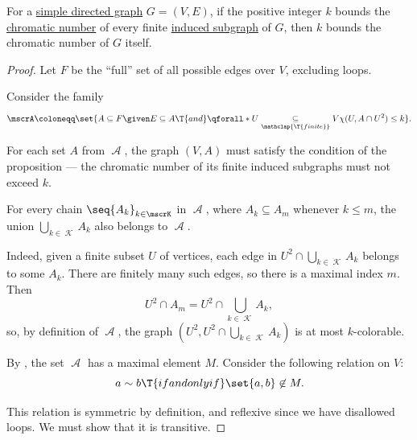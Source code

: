 \begin{theorem}\label{thm:erdos_de_bruijn_theorem}
  For a \hyperref[def:undirected_graph]{simple directed graph} \( G = (V, E) \), if the positive integer \( k \) bounds the \hyperref[def:graph_chromatic_number]{chromatic number} of every finite \hyperref[def:induced_subgraph]{induced subgraph} of \( G \), then \( k \) bounds the chromatic number of \( G \) itself.
\end{theorem}
\begin{proof}
   Let \( F \) be the \enquote{full} set of all possible edges over \( V \), excluding loops.

  Consider the family
  \begin{equation*}
    \mscrA \coloneqq \set{ A \subseteq F \given E \subseteq A \T{and} \qforall*{U \underset {\mathclap{\T{finite}}} \subseteq V} \chi(U, A \cap U^2) \leq k }.
  \end{equation*}

  For each set \( A \) from \( \mscrA \), the graph \( (V, A) \) must satisfy the condition of the proposition --- the chromatic number of its finite induced subgraphs must not exceed \( k \).

  For every chain \( \seq{ A_k }_{k \in \mscrK} \) in \( \mscrA \), where \( A_k \subseteq A_m \) whenever \( k \leq m \), the union \( \bigcup_{k \in \mscrK} A_k \) also belongs to \( \mscrA \).

  Indeed, given a finite subset \( U \) of vertices, each edge in \( U^2 \cap \bigcup_{k \in \mscrK} A_k \) belongs to some \( A_k \). There are finitely many such edges, so there is a maximal index \( m \). Then
  \begin{equation*}
    U^2 \cap A_m = U^2 \cap \bigcup_{k \in \mscrK} A_k,
  \end{equation*}
  so, by definition of \( \mscrA \), the graph \( (U^2, U^2 \cap \bigcup_{k \in \mscrK} A_k) \) is at most \( k \)-colorable.

   By , the set \( \mscrA \) has a maximal element \( M \). Consider the following relation on \( V \):
  \begin{equation*}
    a \sim b \T{if and only if} \set{ a, b } \not\in M.
  \end{equation*}

  This relation is symmetric by definition, and reflexive since we have disallowed loops. We must show that it is transitive.


\end{proof}
